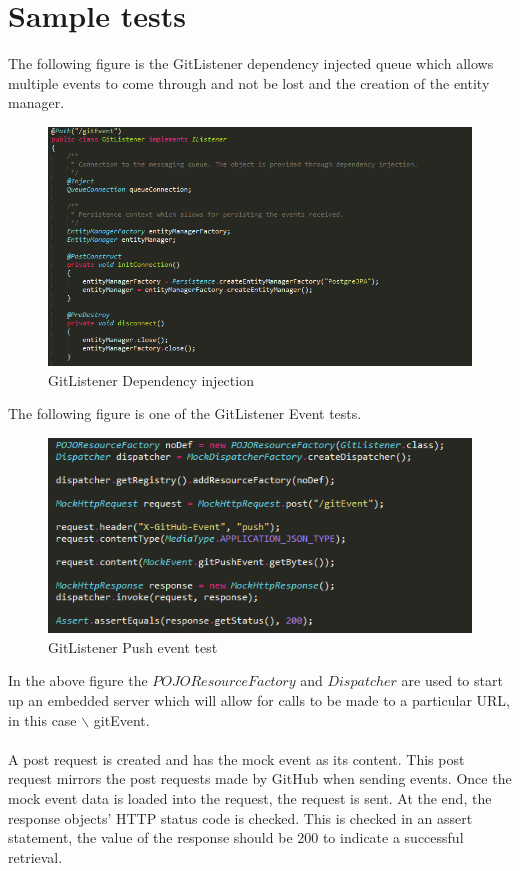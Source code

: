 \documentclass[11pt,a4paper]{article}
\begin{document}
\section{Sample tests}
The following figure is the GitListener dependency injected queue which allows multiple events to come through and not be lost and the creation of the entity manager.
\begin{figure}[H]
	\begin{center}
		\includegraphics[scale=0.7]{../Images/sample3.PNG}
		\caption{GitListener Dependency injection}
	\end{center}
\end{figure}


The following figure is one of the GitListener Event tests.

\begin{figure}[H]
	\begin{center}
		\includegraphics[scale=1.0]{../Images/sample1.PNG}
		\caption{GitListener Push event test}
	\end{center}
\end{figure}
\noindent
In the above figure the $POJOResourceFactory$ and $Dispatcher$ are used to start up an embedded server which will allow for calls to be made to a particular URL, in this case $\backslash$ gitEvent. \\
\\
A post request is created and has the mock event as its content. This post request mirrors the post requests made by GitHub when sending events. Once the mock event data is loaded into the request, the request is sent. At the end, the response objects' HTTP status code is checked. This is checked in an assert statement, the value of the response should be 200 to indicate a successful retrieval. \\
\end{document}
